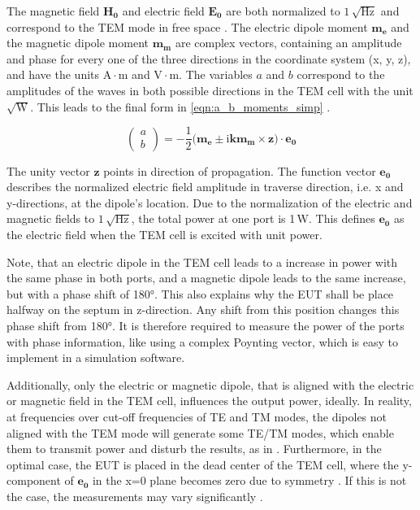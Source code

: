 The magnetic field $\mathbf{H_0}$ and electric field $\mathbf{E_0}$ are both normalized to $1\,\sqrt{\mathrm{Hz}}$ \cite{Kreindl_Bauernfeind_Weiss_Stockreiter_Kaltenbacher_2024} and correspond to the TEM mode in free space \cite{Sreenivasiah_Chang_Ma_1981}. The electric dipole moment $\mathbf{m_e}$ and the magnetic dipole moment $\mathbf{m_m}$ are complex vectors, containing an amplitude and phase for every one of the three directions in the coordinate system (x, y, z), and have the units $\mathrm{A\cdot m}$ and $\mathrm{V\cdot m}$. The variables $a$ and $b$ correspond to the amplitudes of the waves in both possible directions in the TEM cell with the unit $\sqrt{\mathrm{W}}$.
This leads to the final form in \autoref{eqn:a_b_moments_simp} \cite{Sreenivasiah_Chang_Ma_1981}.

\begin{equation}
    \begin{pmatrix}a \\b\end{pmatrix} =-\frac{1}{2}(\mathbf{m_e\pm \mathrm{i}k\mathbf{m_m}\times \mathbf{z})\cdot \mathbf{e_0}}
    \label{eqn:a_b_moments_simp}
\end{equation}

The unity vector $\mathbf{z}$ points in direction of propagation. The function vector $\mathbf{e_0}$ describes the normalized electric field amplitude in traverse direction, i.e. x and y-directions, at the dipole's location. Due to the normalization of the electric and magnetic fields to $1\,\sqrt{\mathrm{Hz}}$, the total power at one port is 1\,W. This defines $\mathbf{e_0}$ as the electric field when the TEM cell is excited with unit power. 

Note, that an electric dipole in the TEM cell leads to a increase in power with the same phase in both ports, and a magnetic dipole leads to the same increase, but with a phase shift of 180°. This also explains why the EUT shall be place halfway on the septum in z-direction. Any shift from this position changes this phase shift from 180°. It is therefore required to measure the power of the ports with phase information, like using a complex Poynting vector, which is easy to implement in a simulation software. 

Additionally, only the electric or magnetic dipole, that is aligned with the electric or magnetic field in the TEM cell, influences the output power, ideally. In reality, at frequencies over cut-off frequencies of TE and TM modes, the dipoles not aligned with the TEM mode will generate some TE/TM modes, which enable them to transmit power and disturb the results, as in \cite{Kreindl_Bauernfeind_Weiss_Stockreiter_Yenumula_Narayanan_Kaltenbacher_2022}. Furthermore, in the optimal case, the EUT is placed in the dead center of the TEM cell, where the y-component of $\mathbf{e_0}$ in the x=0 plane becomes zero due to symmetry \cite{Sreenivasiah_Chang_Ma_1981}. If this is not the case, the measurements may vary significantly \cite{Kreindl_Bauernfeind_Weiss_Stockreiter_Yenumula_Narayanan_Kaltenbacher_2022}.


